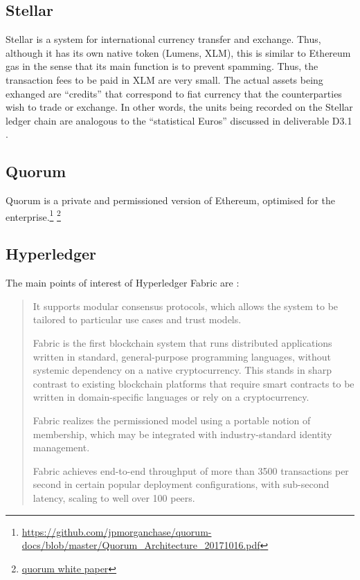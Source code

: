 \subsection{Stellar}
Stellar is a system for international currency transfer and exchange. Thus, although it has its own native token (Lumens, XLM), this is similar to Ethereum gas in the sense that its main function is to prevent spamming. Thus, the transaction fees to be paid in XLM are very small. The actual assets being exhanged are ``credits'' that correspond to fiat currency that the counterparties wish to trade or exchange. In other words, the units being recorded on the Stellar ledger chain are analogous to the ``statistical Euros'' discussed in  deliverable D3.1 \cite{INTERLACE_D31}.



\subsection{Quorum}
Quorum is a private and permissioned version of Ethereum, optimised for the enterprise.\footnote{\url{https://github.com/jpmorganchase/quorum-docs/blob/master/Quorum_Architecture_20171016.pdf}} \footnote{\url{quorum white paper}}




\subsection{Hyperledger}
The main points of interest of Hyperledger Fabric are \cite{AndroulakiEtAl2018}:


\begin{quote}
\begin{packed_item1}
\item It supports modular consensus protocols, which allows the system to be tailored to particular use cases and trust models.
\item Fabric is the first blockchain system that runs distributed applications written in standard, general-purpose programming languages, without systemic dependency on a native cryptocurrency. This stands in sharp contrast to existing blockchain platforms that require smart contracts to be written in domain-specific languages or rely on a cryptocurrency.
\item Fabric realizes the permissioned model using a portable notion of membership, which may be integrated with industry-standard identity management.
\item Fabric achieves end-to-end throughput of more than 3500 transactions per second in certain popular deployment configurations, with sub-second latency, scaling to well over 100 peers.
\end{packed_item1}
\end{quote}



